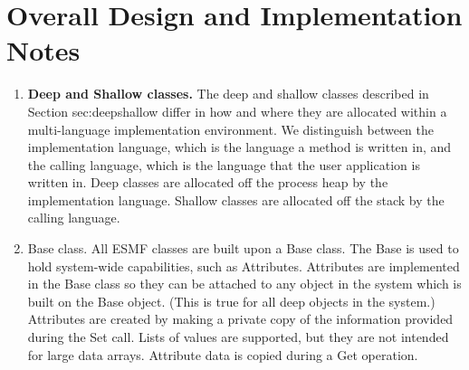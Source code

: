 
\section{Overall Design and Implementation Notes}
\label{sec:overallimpl}

\begin{enumerate}

\item {\bf Deep and Shallow classes.}  The deep and shallow classes 
described in Section {sec:deepshallow} differ in how and where they
are allocated within a multi-language implementation environment.  We
distinguish between the implementation language, which is the language
a method is written in, and the calling language, which is the language
that the user application is written in.  Deep classes are allocated 
off the process heap by the implementation language.  Shallow classes
are allocated off the stack by the calling language.  

\item {Base class.} All ESMF classes are built upon a Base class.  The Base 
is used to hold system-wide capabilities, such as Attributes.  Attributes 
are implemented in the Base class so they can be attached to
any object in the system which is built on the Base object.  (This is true
for all deep objects in the system.)  Attributes are created by making a
private copy of the information provided during the Set call.  Lists of
values are supported, but they are not intended for large
data arrays.   Attribute data is copied during a Get operation.

\end{enumerate}
